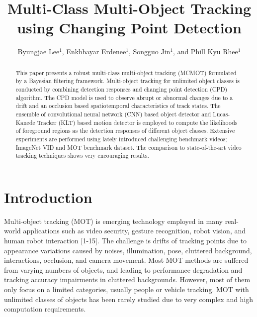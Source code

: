 \documentclass[runningheads]{llncs}
\begin{document}
\pagestyle{headings}
\mainmatter

\title{Multi-Class Multi-Object Tracking using Changing Point Detection} 



\author{Byungjae Lee$^1$, Enkhbayar Erdenee$^1$, Songguo Jin$^1$, and Phill Kyu Rhee$^1$}






\maketitle

\begin{abstract}
This paper presents a robust multi-class multi-object tracking (MCMOT) formulated by a Bayesian filtering framework. Multi-object tracking for unlimited object classes is conducted by combining detection responses and changing  point detection (CPD) algorithm. The CPD model is used to observe abrupt or abnormal changes due to a drift and an occlusion based spatiotemporal characteristics of track states. The ensemble of convolutional neural network (CNN) based object detector and Lucas-Kanede Tracker (KLT) based motion detector is employed to compute the likelihoods of foreground regions as the detection responses of different object classes. Extensive experiments are performed using lately introduced challenging benchmark videos; ImageNet VID and MOT benchmark dataset. The comparison to state-of-the-art video tracking techniques shows very encouraging results. 

\end{abstract}


\section{Introduction}

Multi-object tracking (MOT) is emerging technology employed in many real-world applications such as video security, gesture recognition, robot vision, and human robot interaction [1-15]. The challenge is drifts of tracking points due to appearance variations caused by noises, illumination, pose, cluttered background, interactions, occlusion, and camera movement. Most MOT methods are suffered from varying numbers of objects, and leading to performance degradation and tracking accuracy impairments in cluttered backgrounds. However, most of them only focus on a limited categories, usually people or vehicle tracking. MOT with unlimited classes of objects has been rarely studied due to very complex and high computation requirements.
\end{document}
